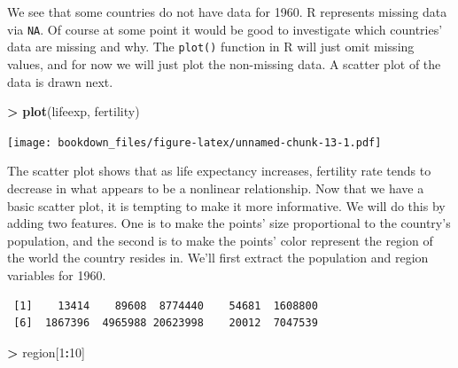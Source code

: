 \documentclass[]{krantz}
\makeatletter
\newenvironment{Shaded}{\begin{snugshade}}{\end{snugshade}}
\newcommand{\KeywordTok}[1]{\textcolor[rgb]{0.27,0.27,0.27}{\textbf{#1}}}
\newcommand{\DecValTok}[1]{\textcolor[rgb]{0.06,0.06,0.06}{#1}}
\newcommand{\StringTok}[1]{\textcolor[rgb]{0.5,0.5,0.5}{#1}}
\newcommand{\OperatorTok}[1]{\textcolor[rgb]{0.43,0.43,0.43}{\textbf{#1}}}
\newcommand{\NormalTok}[1]{#1}
\newenvironment{kframe}{%
\medskip{}
\setlength{\fboxsep}{.8em}
 \def\at@end@of@kframe{}%
 \ifinner\ifhmode%
  \def\at@end@of@kframe{\end{minipage}}%
  \begin{minipage}{\columnwidth}%
 \fi\fi%
 \def\FrameCommand##1{\hskip\@totalleftmargin \hskip-\fboxsep
 \colorbox{shadecolor}{##1}\hskip-\fboxsep
     \hskip-\linewidth \hskip-\@totalleftmargin \hskip\columnwidth}%
 \MakeFramed {\advance\hsize-\width
   \@totalleftmargin\z@ \linewidth\hsize
   \@setminipage}}%
 {\par\unskip\endMakeFramed%
 \at@end@of@kframe}
\renewenvironment{Shaded}{\begin{kframe}}{\end{kframe}}
\makeatother
\begin{document}
We see that some countries do not have data for 1960. R represents
missing data via \texttt{NA}. Of course at some point it would be good
to investigate which countries' data are missing and why. The
\texttt{plot()} function in R will just omit missing values, and for now
we will just plot the non-missing data. A scatter plot of the data is
drawn next.

\begin{Shaded}
\begin{Highlighting}[]
\OperatorTok{>}\StringTok{ }\KeywordTok{plot}\NormalTok{(lifeexp, fertility)}
\end{Highlighting}
\end{Shaded}

\texttt{[image: bookdown\_files/figure-latex/unnamed-chunk-13-1.pdf]}

The scatter plot shows that as life expectancy increases, fertility rate
tends to decrease in what appears to be a nonlinear relationship. Now
that we have a basic scatter plot, it is tempting to make it more
informative. We will do this by adding two features. One is to make the
points' size proportional to the country's population, and the second is
to make the points' color represent the region of the world the country
resides in. We'll first extract the population and region variables for
1960.

\begin{Shaded}
\end{Shaded}

\begin{verbatim}
 [1]    13414    89608  8774440    54681  1608800
 [6]  1867396  4965988 20623998    20012  7047539
\end{verbatim}

\begin{Shaded}
\begin{Highlighting}[]
\OperatorTok{>}\StringTok{ }\NormalTok{region[}\DecValTok{1}\OperatorTok{:}\DecValTok{10}\NormalTok{]}
\end{Highlighting}
\end{Shaded}
\end{document}
